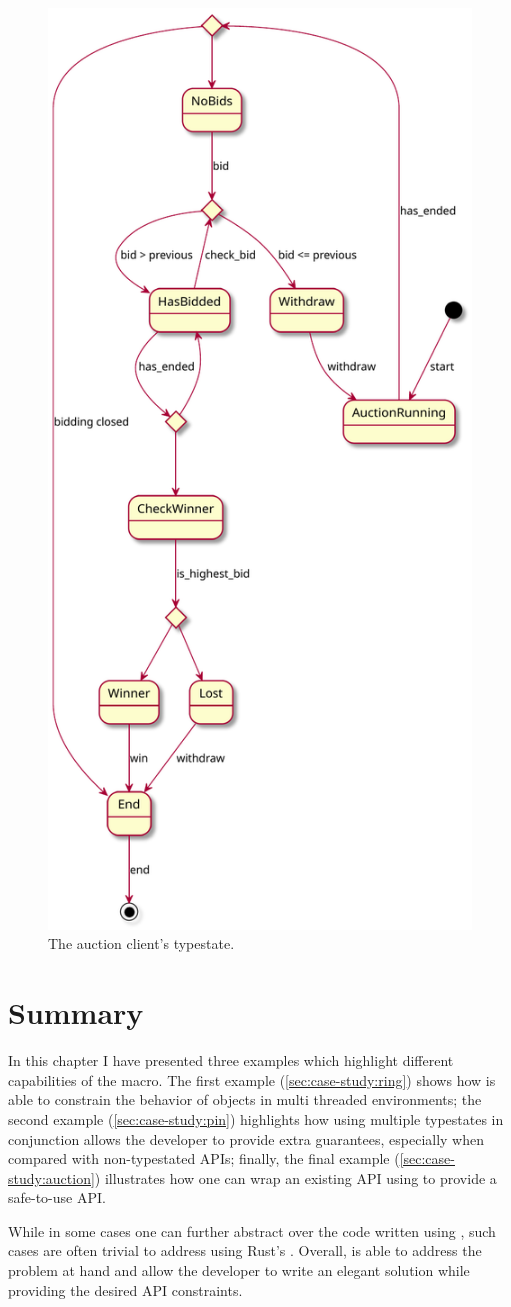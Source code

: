 \begin{figure}
    \centering
    \includegraphics[width=0.6\linewidth]{Chapters/Figures/C5/auction_client.pdf}
    \caption{The auction client's typestate.}
    \label{fig:auction-typestate}
\end{figure}

\section{Summary}

In this chapter I have presented three examples which highlight different capabilities of the \textcolor{attrgreen}{} macro.
The first example (\autoref{sec:case-study:ring}) shows how \textcolor{attrgreen}{} is able to constrain the behavior of objects in multi threaded environments;
the second example (\autoref{sec:case-study:pin}) highlights how using multiple typestates in conjunction allows the developer to provide extra guarantees,
especially when compared with non-typestated APIs;
finally, the final example (\autoref{sec:case-study:auction}) illustrates how one can wrap an existing API using \textcolor{attrgreen}{}
to provide a safe-to-use API.

While in some cases one can further abstract over the code written using \textcolor{attrgreen}{},
such cases are often trivial to address using Rust's .
Overall, \textcolor{attrgreen}{} is able to address the problem at hand and
allow the developer to write an elegant solution while providing the desired API constraints.